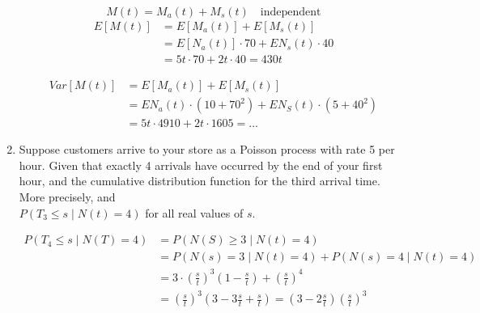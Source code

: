 \documentclass[12pt]{article}
\begin{document}
\begin{enumerate}
    
    $$M(t)=M_a(t)+M_s(t) \quad\text{independent}$$
    \begin{align}
        E[M(t)] &= E[M_a(t)]+E[M_s(t)]\nonumber \\
        &=E[N_a(t)]\cdot 70 +EN_s(t)\cdot 40 \nonumber \\
        &=5t\cdot 70 +2t\cdot 40  = 430t \nonumber
    \end{align}
    
    \begin{align}
        Var[M(t)]&=E[M_a(t)]+E[M_s(t)]\nonumber \\
        &=EN_a(t)\cdot(10+70^2)+EN_S(t)\cdot(5+40^2)\nonumber\\
        &=5t\cdot 4910 +2t\cdot 1605 =...\nonumber
    \end{align}
    
    \item Suppose customers arrive to your store as a Poisson process with rate 5 per hour. Given that exactly 4 arrivals have occurred by the end of your first hour, and the cumulative distribution function for the third arrival time. More precisely, and\\ $P(T_3\le s \;|\;N(t)=4)$ for all real values of $s$.
    
    \begin{align}
        P(T_4\le s\;|\; N(T)=4) &= P(N(S)\ge 3\;|\; N(t) =4) \nonumber \\
        &=P(N(s)=3\;|\;N(t)=4)+P(N(s)=4\;|\;N(t)=4) \nonumber \\
        &=3\cdot\left(\frac{s}{t}\right)^3\left(1-\frac{s}{t}\right) + \left(\frac{s}{t}\right)^4 \nonumber \\
        &=\left(\frac{s}{t}\right)^3(3-3\frac{s}{t} +\frac{s}{t}) = (3-2\frac{s}{t})\left(\frac{s}{t}\right)^3 \nonumber
    \end{align}
\end{enumerate}
\end{document}
